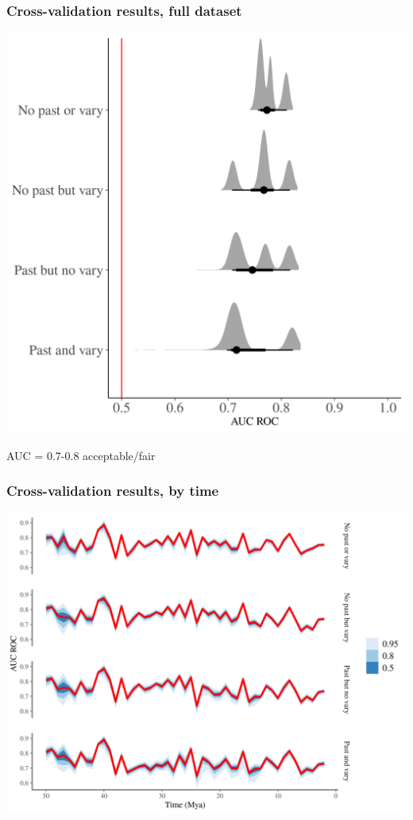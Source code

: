 \documentclass{beamer}
\begin{document}
\begin{frame}
  \frametitle{Cross-validation results, full dataset}

  \begin{center}
    \includegraphics[width=\textwidth,height=0.8\textheight,keepaspectratio=true]{../results/figure/fold_auc_zoom}

    \footnotesize{AUC = 0.7-0.8 acceptable/fair}
  \end{center}

\end{frame}

\begin{frame}
  \frametitle{Cross-validation results, by time}

  \begin{center}
    \includegraphics[width=\textwidth,height=0.8\textheight,keepaspectratio=true]{../results/figure/fold_auc_time}
  \end{center}

\end{frame}
\end{document}
